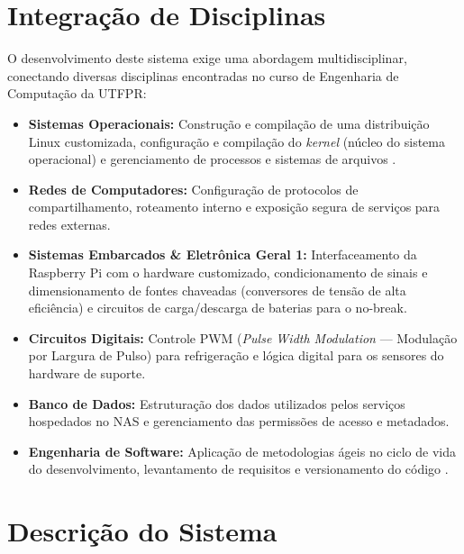 \documentclass[a4paper,12pt]{article}
\begin{document}
\section{Integração de Disciplinas}  
O desenvolvimento deste sistema exige uma abordagem multidisciplinar, conectando diversas disciplinas encontradas no curso de Engenharia de Computação da UTFPR:
\begin{itemize}
    \item \textbf{Sistemas Operacionais:} Construção e compilação de uma distribuição Linux customizada, configuração e compilação do \textit{kernel} (núcleo do sistema operacional) e gerenciamento de processos e sistemas de arquivos \cite{tanenbaum2015}.
    \item \textbf{Redes de Computadores:} Configuração de protocolos de compartilhamento, roteamento interno e exposição segura de serviços para redes externas.
    \item \textbf{Sistemas Embarcados \& Eletrônica Geral 1:} Interfaceamento da Raspberry Pi com o hardware customizado, condicionamento de sinais e dimensionamento de fontes chaveadas (conversores de tensão de alta eficiência) e circuitos de carga/descarga de baterias para o no-break.
    \item \textbf{Circuitos Digitais:} Controle PWM (\textit{Pulse Width Modulation} --- Modulação por Largura de Pulso) para refrigeração e lógica digital para os sensores do hardware de suporte.
    \item \textbf{Banco de Dados:} Estruturação dos dados utilizados pelos serviços hospedados no NAS e gerenciamento das permissões de acesso e metadados.
    \item \textbf{Engenharia de Software:} Aplicação de metodologias ágeis no ciclo de vida do desenvolvimento, levantamento de requisitos e versionamento do código \cite{sommerville2011}.
\end{itemize}

\vspace{1em}  

\section{Descrição do Sistema}
\end{document}
